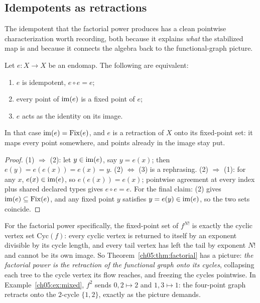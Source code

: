 \subsection{Idempotents as retractions}
\label{ch05:sec:retractions}

The idempotent that the factorial power produces has a clean pointwise
characterization worth recording, both because it explains \emph{what} the
stabilized map is and because it connects the algebra back to the
functional-graph picture.

\begin{proposition}
\label{ch05:prop:retraction}
Let $e : X \to X$ be an endomap. The following are equivalent:
\begin{enumerate}
\item $e$ is idempotent, $e \circ e = e$;
\item every point of $\mathrm{im}(e)$ is a fixed point of $e$;
\item $e$ acts as the identity on its image.
\end{enumerate}
In that case $\mathrm{im}(e) = \mathrm{Fix}(e)$, and $e$ is a retraction of $X$
onto its fixed-point set: it maps every point somewhere, and points
already in the image stay put.
\end{proposition}

\begin{proof}
(1) $\Rightarrow$ (2): let $y \in \mathrm{im}(e)$, say $y = e(x)$; then
$e(y) = e(e(x)) = e(x) = y$. (2) $\Leftrightarrow$ (3) is a rephrasing.
(2) $\Rightarrow$ (1): for any $x$, $e(x) \in \mathrm{im}(e)$, so
$e(e(x)) = e(x)$; pointwise agreement at every index plus shared declared
types gives $e \circ e = e$. For the final claim:
(2) gives $\mathrm{im}(e) \subseteq \mathrm{Fix}(e)$, and any fixed point $y$
satisfies $y = e(y) \in \mathrm{im}(e)$, so the two sets coincide.
\end{proof}

For the factorial power specifically, the fixed-point set of $f^{N!}$ is
exactly the cyclic vertex set $\mathrm{Cyc}(f)$: every cyclic vertex is
returned to itself by an exponent divisible by its cycle length, and every
tail vertex has left the tail by exponent $N!$ and cannot be its own
image. So Theorem~\ref{ch05:thm:factorial} has a picture: \emph{the
factorial power is the retraction of the functional graph onto its
cycles}, collapsing each tree to the cycle vertex its flow reaches, and
freezing the cycles pointwise. In Example~\ref{ch05:ex:mixed}, $f^{2}$
sends $0, 2 \mapsto 2$ and $1, 3 \mapsto 1$: the four-point graph retracts
onto the $2$-cycle $\{1, 2\}$, exactly as the picture demands.


